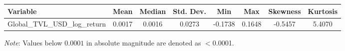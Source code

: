 \begin{tabular}{lccccccc}
  \toprule
  \textbf{Variable} & \textbf{Mean} & \textbf{Median} & \textbf{Std. Dev.} & \textbf{Min} & \textbf{Max} & \textbf{Skewness} & \textbf{Kurtosis} \\ 
  \midrule
  Global\_TVL\_USD\_log\_return & 0.0017 & 0.0016 & 0.0273 & -0.1738 & 0.1648 & -0.5457 & 5.4070 \\ 
  \bottomrule
\end{tabular}
\par\vspace{4pt}
\begin{minipage}{\linewidth}
  \footnotesize \textit{Note}: Values below $0.0001$ in absolute magnitude are denoted as $<$0.0001.
\end{minipage}
